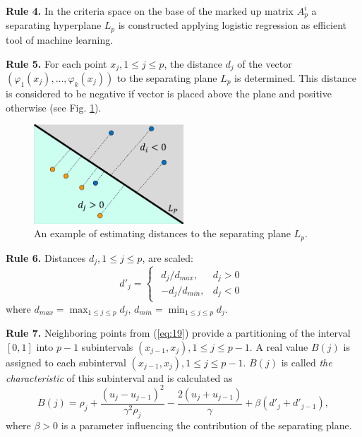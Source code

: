 \documentclass[runningheads]{llncs}
\begin{document}
\textbf{Rule 4.} In the criteria space on the base of the marked up matrix $A^i_p$ a separating hyperplane $L_p$ is constructed applying logistic regression \cite{Yu2011} as efficient tool of machine learning.

\textbf{Rule 5.} For each point $x_j, 1 \leq j \leq p$, the distance $d_j$ of the vector $(\varphi_1(x_j), \dots, \varphi_k(x_j))$ to the separating plane $L_p$ is determined. This distance is considered to be negative if vector is placed above the plane and positive otherwise (see Fig. \ref{fig:1}).

\begin{figure}
\centering
\includegraphics[width=0.5\textwidth]{fig1}
\caption{An example of estimating distances to the separating plane $L_p$.} \label{fig:1}
\end{figure}

\textbf{Rule 6.} Distances $d_j, 1 \leq j \leq p$, are scaled:     
\begin{equation}
    \label{eq:23}
d'_j=
\begin{cases}
  \begin{matrix}
     d_j / d_{max}, & d_j > 0 \\
     -d_j / d_{min}, & d_j < 0 
  \end{matrix}
\end{cases}
\end{equation}
where $d_{max} = \max_{1 \leq j \leq p} {d_j}$, $d_{min} = \min_{1 \leq j \leq p} {d_j}$.    

\textbf{Rule 7.} Neighboring points from (\ref{eq:19}) provide a partitioning of the interval $[0, 1]$ into $p-1$ subintervals $(x_{j-1}, x_j), 1 \leq j \leq p-1$.
A real value $B(j)$ is assigned to each subinterval $(x_{j-1}, x_j), 1 \leq j \leq p-1$. $B(j)$ is called \textit{the characteristic}  of this subinterval and is calculated as
\begin{equation}
    \label{eq:24}
    B(j) = \rho_j + \frac{(u_j-u_{j-1})^2}{\gamma^2 \rho_j} - \frac{2 (u_j+u_{j-1})}{\gamma} + \beta (d'_j + d'_{j-1}),
\end{equation}
where $\beta > 0$ is a parameter influencing the contribution of the separating plane. 
\end{document}
